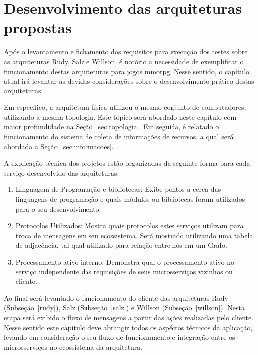  
\chapter{Desenvolvimento das arquiteturas propostas}
\label{cap5}



Após o levantamento e fichamento dos requisitos para execução dos testes sobre as arquiteturas Rudy, Salz e Willson, é notório a necessidade de exemplificar o funcionamento destas arquiteturas para jogos \ac{mmorpg}.
%
Nesse sentido, o capítulo atual irá levantar as devidas considerações sobre o desenvolvimento prático destas arquiteturas. %


Em específico, a arquitetura física utilizou o mesmo conjunto de computadores, utilizando a mesma topologia.
%
Este tópico será abordado neste capítulo com maior profundidade na Seção~\ref{sec:topologia}. %
%
Em seguida, é relatado o funcionamento do sistema de coleta de informações de recursos, a qual será abordada a Seção~\ref{sec:informacoes}. %

A explicação técnica dos projetos estão organizadas da seguinte forma para cada serviço desenvolvido das arquiteturas:


\begin{enumerate}
    \item Linguagem de Programação e bibliotecas: Exibe pontos a cerca das linguagens de programação e quais módulos ou bibliotecas foram utilizados para o seu desenvolvimento.
    \item Protocolos Utilizados: Mostra quais protocolos estes serviços utilizam para troca de mensagens em seu ecossistema. Será mostrado utilizando uma tabela de adjacência, tal qual utilizado para relação entre nós em um Grafo.%
    \item Processamento ativo interno: Demonstra qual o processamento ativo no serviço independente das requisições de seus microsserviços vizinhos ou cliente. %
\end{enumerate}



Ao final será levantado o funcionamento do cliente das arquiteturas Rudy (Subseção~\ref{rudy}), Salz (Subseção~\ref{salz}) e Willson (Subseção~\ref{willson}). %
%
Nesta etapa será exibido o fluxo de mensagens a partir das ações realizadas pelo cliente. %
%
Nesse sentido este capítulo deve abrangir todos os aspéctos técnicos da aplicação, levando em consideração o seu fluxo de funcionamento e integração entre os microsserviços no ecossistema da arquitetura. %


